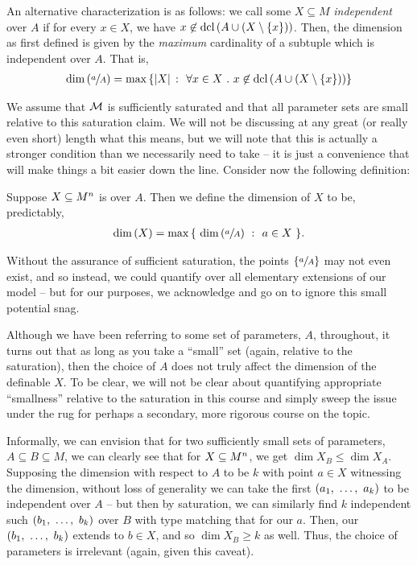 An alternative characterization is as follows: we call some $X \subseteq M$ \emph{independent} over $A$ if for every $x \in X$, we have $x \not\in \dcl{A \cup (X \setminus \{ x \})}$. Then, the dimension as first defined is given by the \emph{maximum} cardinality of a subtuple which is independent over $A$. That is,
  \begin{align*}
    \dim{ \sfrac{a}{A} } = \max{ \left\{ \card{X} \ \colon \ \forall x \in X \ . \ x \not\in \dcl{A \cup (X \setminus \{ x \})} \right\} }
  \end{align*}

We assume that $\M$ is sufficiently saturated and that all parameter sets are small relative to this saturation claim. We will not be discussing at any great (or really even short) length what this means, but we will note that this is actually a stronger condition than we necessarily need to take -- it is just a convenience that will make things a bit easier down the line. Consider now the following definition:

\begin{definition}
  Suppose $\XMn[X]{n}$ is  over $A$. Then we define the dimension of $X$ to be, predictably,
    \begin{align*}
      \dim{X} = \max{ \left\{ \ \dim{\sfrac{a}{A}} \ \colon \ a \in X \ \right\} }.
    \end{align*}
    \label{defn:alg_dim}
\end{definition}

\begin{remark}
  Without the assurance of sufficient saturation, the points $\left\{ \sfrac{a}{A} \right\}$ may not even exist, and so instead, we could quantify over all elementary extensions of our model -- but for our purposes, we acknowledge and go on to ignore this small potential snag.
\end{remark}

Although we have been referring to some set of parameters, $A$, throughout, it turns out that as long as you take a ``small'' set (again, relative to the saturation), then the choice of $A$ does not truly affect the dimension of the definable $X$. To be clear, we will not be clear about quantifying appropriate ``smallness'' relative to the saturation in this course and simply sweep the issue under the rug for perhaps a secondary, more rigorous course on the topic.

Informally, we can envision that for two sufficiently small sets of parameters, $A \subseteq B \subseteq M$, we can clearly see that for  $\XMn{n}$, we get $\dim{X}_B \leq \dim{X}_A$. Supposing the dimension with respect to $A$ to be $k$ with point $a \in X$ witnessing the dimension, without loss of generality we can take the first $(\vonevm{a}{k})$ to be independent over $A$ -- but then by saturation, we can similarly find $k$ independent such $(\vonevm{b}{k})$ over $B$ with type matching that for our $a$. Then, our $(\vonevm{b}{k})$ extends to $b \in X$, and so $\dim{X}_B \geq k$ as well. Thus, the choice of parameters is irrelevant (again, given this caveat).


